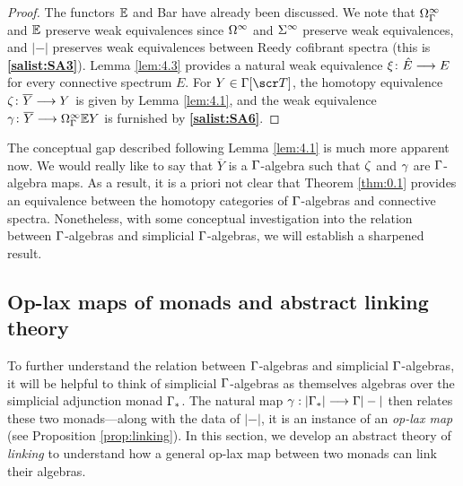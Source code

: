 \documentclass{amsart}
\newtheorem{thm}{Theorem}[section]
\theoremstyle{definition}
\begin{document}
\maintheorem*


\begin{proof}
    The functors $\mathbb{E}$ and Bar have already been discussed. We note that $\Omega^{\infty}_{\Gamma}$ and $\mathbb{E}$ preserve weak equivalences since $\Omega^{\infty}$ and $\Sigma^{\infty}$ preserve weak equivalences, and $|-|$ preserves weak equivalences between Reedy cofibrant spectra (this is \textbf{\ref{salist:SA3}}). Lemma \ref{lem:4.3} provides a natural weak equivalence $\xi \colon \hat{E} \longrightarrow E$ for every connective spectrum $E$.
    For $Y \in \GA[\sT]$, the homotopy equivalence $\zeta \colon \overline{Y} \longrightarrow Y$ is given by Lemma \ref{lem:4.1}, and the weak equivalence $\gamma \colon \overline{Y} \longrightarrow \Omega^{\infty}_{\Gamma} \mathbb{E} Y$ is furnished by \textbf{\ref{salist:SA6}}.
\end{proof}

The conceptual gap described following Lemma \ref{lem:4.1} is much more apparent now. We would really like to say that $\overline{Y}$ is a $\Gamma$-algebra such that $\zeta$ and $\gamma$ are $\Gamma$-algebra maps. As a result, it is a priori not clear that Theorem \ref{thm:0.1} provides an equivalence between the homotopy categories of $\Gamma$-algebras and connective spectra.
Nonetheless, with some conceptual investigation into the relation between $\Gamma$-algebras and simplicial $\Gamma$-algebras, we will establish a sharpened result.\\

\subsection{Op-lax maps of monads and abstract linking theory}
To further understand the relation between $\Gamma$-algebras and simplicial $\Gamma$-algebras, it will be helpful to think of simplicial $\Gamma$-algebras as themselves algebras over the simplicial adjunction monad $\Gamma_*$. The natural map $\gamma : |\Gamma_*| \longrightarrow \Gamma |-|$ then relates these two monads---along with the data of $|-|$, it is an instance of an \emph{op-lax map} (see Proposition \ref{prop:linking}). In this section, 
we develop an abstract theory of \emph{linking} to understand how a general op-lax map between two monads can link their algebras.\\
\end{document}
